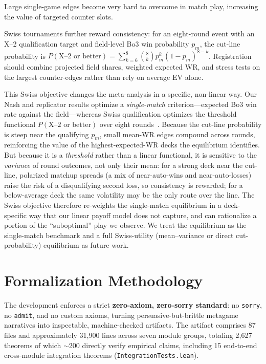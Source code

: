 \documentclass[journal]{IEEEtran}
\newif\ifhighlightchanges
\newcommand{\revised}[1]{\ifhighlightchanges\textcolor{blue!70!black}{#1}\else#1\fi}
\let\origsection\section
\renewcommand{\section}{\needspace{4\baselineskip}\origsection}
\begin{document}
Large single-game edges become very hard to overcome in match play, increasing the value of targeted counter slots.

Swiss tournaments further reward consistency: for an eight-round event with an X--2 qualification target and field-level Bo3 win probability $p_m$, the cut-line probability is
$P(\text{X--2 or better}) = \sum_{k=6}^{8} \binom{8}{k} p_m^k (1-p_m)^{8-k}$.
Registration should combine projected field shares, weighted expected WR, and stress tests on the largest counter-edges rather than rely on average EV alone.

\revised{This Swiss objective changes the meta-analysis in a specific, non-linear way.
Our Nash and replicator results optimize a \emph{single-match} criterion---expected Bo3 win rate against the field---whereas Swiss qualification optimizes the threshold functional $P(\text{X--2 or better})$ over eight rounds~\cite{romero2022swiss}.
Because the cut-line probability is steep near the qualifying $p_m$, small mean-WR edges compound across rounds, reinforcing the value of the highest-expected-WR decks the equilibrium identifies.
But because it is a \emph{threshold} rather than a linear functional, it is sensitive to the \emph{variance} of round outcomes, not only their mean: for a strong deck near the cut-line, polarized matchup spreads (a mix of near-auto-wins and near-auto-losses) raise the risk of a disqualifying second loss, so consistency is rewarded; for a below-average deck the same volatility may be the only route over the line.
The Swiss objective therefore re-weights the single-match equilibrium in a deck-specific way that our linear payoff model does not capture, and can rationalize a portion of the ``suboptimal'' play we observe.
We treat the equilibrium as the single-match benchmark and a full Swiss-utility (mean--variance or direct cut-probability) equilibrium as future work.}

\section{Formalization Methodology}\label{sec:methodology}

The development enforces a strict \textbf{zero-axiom, zero-sorry standard}: no \texttt{sorry}, no \texttt{admit}, and no custom axioms, turning persuasive-but-brittle metagame narratives into inspectable, machine-checked artifacts.
The artifact comprises 87 files and approximately 31{,}900 lines across seven module groups, totaling 2{,}627 theorems of which ${\sim}$200 directly verify empirical claims, including 15 end-to-end cross-module integration theorems (\texttt{IntegrationTests.lean}).
\end{document}
